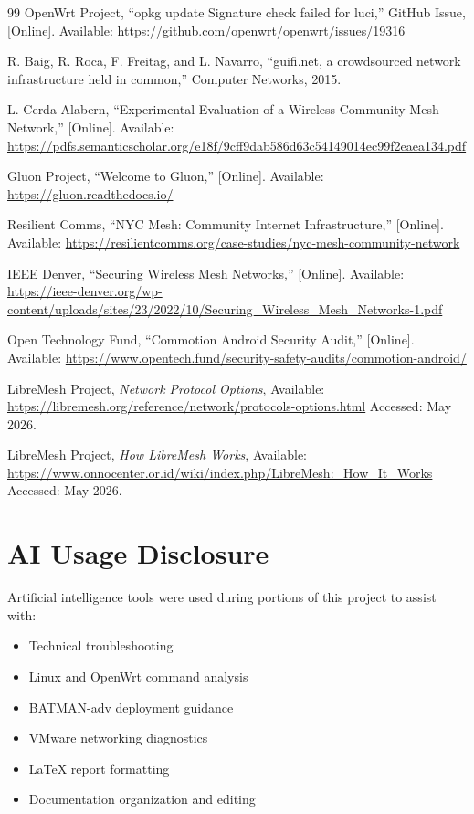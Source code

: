 \documentclass[conference]{IEEEtran}
\begin{document}
\begin{thebibliography}{99}
OpenWrt Project, ``opkg update Signature check failed for luci,'' GitHub Issue, [Online]. Available: \url{https://github.com/openwrt/openwrt/issues/19316}

R. Baig, R. Roca, F. Freitag, and L. Navarro, ``guifi.net, a crowdsourced network infrastructure held in common,'' Computer Networks, 2015.

L. Cerda-Alabern, ``Experimental Evaluation of a Wireless Community Mesh Network,'' [Online]. Available: \url{https://pdfs.semanticscholar.org/e18f/9cff9dab586d63c54149014ec99f2eaea134.pdf}

Gluon Project, ``Welcome to Gluon,'' [Online]. Available: \url{https://gluon.readthedocs.io/}

Resilient Comms, ``NYC Mesh: Community Internet Infrastructure,'' [Online]. Available: \url{https://resilientcomms.org/case-studies/nyc-mesh-community-network}

IEEE Denver, ``Securing Wireless Mesh Networks,'' [Online]. Available: \url{https://ieee-denver.org/wp-content/uploads/sites/23/2022/10/Securing_Wireless_Mesh_Networks-1.pdf}

Open Technology Fund, ``Commotion Android Security Audit,'' [Online]. Available: \url{https://www.opentech.fund/security-safety-audits/commotion-android/}

LibreMesh Project,
\textit{Network Protocol Options},
Available: \url{https://libremesh.org/reference/network/protocols-options.html}
Accessed: May 2026.

LibreMesh Project,
\textit{How LibreMesh Works},
Available: \url{https://www.onnocenter.or.id/wiki/index.php/LibreMesh:_How_It_Works}
Accessed: May 2026.

\end{thebibliography}

\section*{AI Usage Disclosure}

Artificial intelligence tools were used during portions of this project to assist with:

\begin{itemize}
    \item Technical troubleshooting
    \item Linux and OpenWrt command analysis
    \item BATMAN-adv deployment guidance
    \item VMware networking diagnostics
    \item LaTeX report formatting
    \item Documentation organization and editing
\end{itemize}
\end{document}
